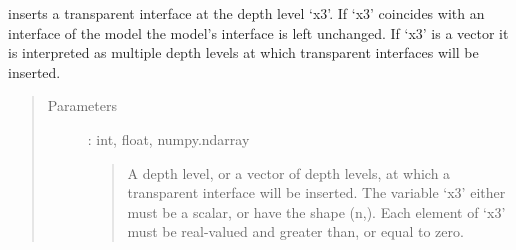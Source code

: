 \documentclass[letterpaper,10pt,english]{sphinxmanual}
\begin{document}
\begin{fulllineitems}
\begin{fulllineitems}
%
\begin{sphinxVerbatim}[commandchars=\\\{\}]
  
                         
                     
\PYG{p}{[}\PYG{p}{]}\PYG{p}{[}\PYG{p}{]}
\end{sphinxVerbatim}

\end{fulllineitems}


\begin{fulllineitems}
\label{\detokenize{Layered_NRM_p_w:Layered_NRM_p_w.Layered_NRM_p_w.Insert_layer}}
inserts a transparent interface at the depth level ‘x3’. If ‘x3’ coincides with an interface of the model the model’s interface is left unchanged. If ‘x3’ is a vector it is interpreted as multiple depth levels at which transparent interfaces will be inserted.
\begin{quote}\begin{description}
\item[{Parameters}] \leavevmode
{} : int, float, numpy.ndarray
\begin{quote}

A depth level, or a vector of depth levels, at which a transparent interface will be inserted. The variable ‘x3’ either must be a scalar, or have the shape (n,). Each element of ‘x3’ must be real-valued and greater than, or equal to zero.
\end{quote}


\end{description}
\end{quote}
\end{fulllineitems}
\end{fulllineitems}
\end{document}
